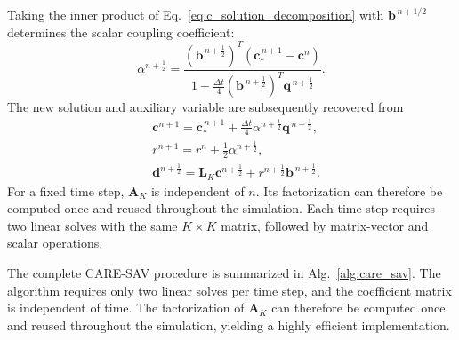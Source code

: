 \documentclass[10pt,reqno]{amsart}
\theoremstyle{remark}
\theoremstyle{definition}
\renewcommand \dfrac{\displaystyle\frac}
\begin{document}
Taking the inner product of Eq.~\eqref{eq:c_solution_decomposition} with $\boldsymbol b^{\,n+1/2}$ determines the scalar coupling coefficient:
\begin{equation}
  \alpha^{n+\frac12} = \frac{\left(\boldsymbol b^{\,n+\frac12}\right)^{T}\left(\boldsymbol c_*^{\,n+1}-\boldsymbol c^n\right)}{1-\dfrac{\Delta t}{4}\left(\boldsymbol b^{\,n+\frac12}\right)^{T}\boldsymbol q^{\,n+\frac12}}.
\label{eq:scalar_alpha}
\end{equation}
The new solution and auxiliary variable are subsequently recovered from
\begin{equation}
\begin{aligned}
  &\boldsymbol c^{n+1} = \boldsymbol c_*^{\,n+1} + \frac{\Delta t}{4} \alpha^{n+\frac12}\boldsymbol q^{\,n+\frac12},\\
  &r^{n+1} = r^n+\frac12\alpha^{n+\frac12}, \\
  &\boldsymbol d^{n+\frac12} = \boldsymbol{L}_K\boldsymbol c^{n+\frac12} + r^{n+\frac12}\boldsymbol b^{\,n+\frac12}.
\end{aligned}
\label{eq:care_sav_solution_recovery}
\end{equation}
For a fixed time step, $\boldsymbol{A}_K$ is independent of $n$. Its factorization can therefore be computed once and reused throughout the simulation. Each time step requires two linear solves with the same $K\times K$ matrix, followed by matrix-vector and scalar operations.

The complete CARE-SAV procedure is summarized in Alg.~\ref{alg:care_sav}. The algorithm requires only two linear solves per time step, and the coefficient matrix is independent of time. The factorization of $\boldsymbol{A}_K$ can therefore be computed once and reused throughout the simulation, yielding a highly efficient implementation.
\end{document}
